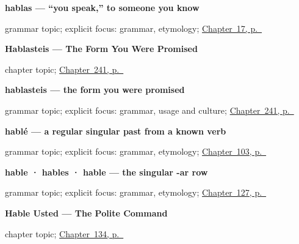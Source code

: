 \noindent\begin{minipage}[t]{\linewidth}
\raggedright
\textbf{hablas — \textquotedblleft{}you speak,\textquotedblright{} to someone you know}\par
\footnotesize grammar topic; explicit focus: grammar, etymology; \hyperref[ch:hablas]{Chapter~17, p.~\pageref*{ch:hablas}}
\end{minipage}\par\smallskip

\noindent\begin{minipage}[t]{\linewidth}
\raggedright
\textbf{Hablasteis --- The Form You Were Promised}\par
\footnotesize chapter topic; \hyperref[ch:hablasteis]{Chapter~241, p.~\pageref*{ch:hablasteis}}
\end{minipage}\par\smallskip

\noindent\begin{minipage}[t]{\linewidth}
\raggedright
\textbf{hablasteis — the form you were promised}\par
\footnotesize grammar topic; explicit focus: grammar, usage and culture; \hyperref[ch:hablasteis]{Chapter~241, p.~\pageref*{ch:hablasteis}}
\end{minipage}\par\smallskip

\noindent\begin{minipage}[t]{\linewidth}
\raggedright
\textbf{hablé — a regular singular past from a known verb}\par
\footnotesize grammar topic; explicit focus: grammar, etymology; \hyperref[ch:preterite]{Chapter~103, p.~\pageref*{ch:preterite}}
\end{minipage}\par\smallskip

\noindent\begin{minipage}[t]{\linewidth}
\raggedright
\textbf{hable · hables · hable — the singular -ar row}\par
\footnotesize grammar topic; explicit focus: grammar, etymology; \hyperref[ch:spanish-subjuntivo-regular]{Chapter~127, p.~\pageref*{ch:spanish-subjuntivo-regular}}
\end{minipage}\par\smallskip

\noindent\begin{minipage}[t]{\linewidth}
\raggedright
\textbf{Hable Usted --- The Polite Command}\par
\footnotesize chapter topic; \hyperref[ch:command-usted]{Chapter~134, p.~\pageref*{ch:command-usted}}
\end{minipage}\par\smallskip

